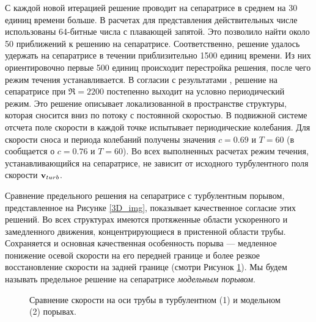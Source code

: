 С каждой новой итерацией решение проводит на сепаратрисе в среднем на 30 единиц времени больше. В расчетах для представления действительных числе использованы 64-битные числа с плавающей запятой. Это позволило найти около 50 приближений к решению на сепаратрисе. Соответственно, решение удалось удержать на сепаратрисе в течении приблизительно 1500 единиц времени. Из них ориентировочно первые 500 единиц происходит перестройка решения, после чего режим течения устанавливается. В согласии с результатами \cite{Avila2013}, решение на сепаратрисе при $\Re=2200$ постепенно выходит на условно периодический режим. Это решение описывает локализованной в пространстве структуры, которая сносится вниз по потоку с постоянной скоростью. В подвижной системе отсчета поле скорости в каждой точке испытывает периодические колебания. Для скорости сноса и периода колебаний получены значения $c=0.69$ и $T=60$ (в \cite{Avila2013} сообщается о $c=0.76$ и $T=60$). Во всех выполненных расчетах режим течения, устанавливающийся на сепаратрисе, не зависит от исходного турбулентного поля скорости $\mathbf{v}_{turb}$. 

\begin{comment}
Так как скорость сноса модельного порыва заранее не известна, решение на сепаратрисе было найдено в системе отсчета, двигающейся со скоростью $0.5$. После того, как решение на сепаратрисе найдено, изменить скорость перемещения системы отсчета уже не представляется возможным вследствие высокой чувствительности решения к возмущениям, возникающим в данном случае в результате неточностей численного интегрирования. Чтобы получить решение в сопутствующей системе отсчета, метод поиска решения на сепаратрисе применен повторно в системе отсчета, двигающейся с уже известной скоростью перемещения порыва. 
\end{comment}

Сравнение предельного решения на сепаратрисе с турбулентным порывом, представленное на Рисунке \ref{3D_img}, показывает качественное согласие этих решений. Во всех структурах имеются протяженные области ускоренного и замедленного движения, концентрирующиеся в пристенной области трубы. Сохраняется и основная качественная особенность порыва --- медленное понижение осевой скорости на его передней границе и более резкое восстановление скорости на задней границе (смотри Рисунок \ref{ucl_cmp_img}). Мы будем называть предельное решение на сепаратрисе {\it модельным порывом}.  

\begin{figure}
\caption{Сравнение скорости на оси трубы в турбулентном (1) и модельном (2) порывах.}
\label{ucl_cmp_img}
\end{figure}

